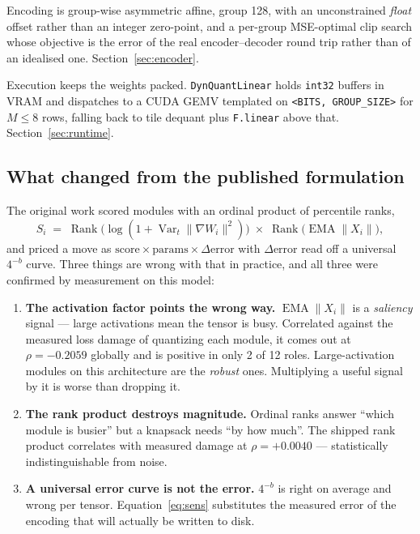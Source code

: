 \documentclass[11pt]{article}
\newcommand{\code}[1]{\texttt{#1}}
\begin{document}
Encoding is group-wise asymmetric affine, group 128, with an unconstrained \emph{float} offset
rather than an integer zero-point, and a per-group MSE-optimal clip search whose objective is the
error of the real encoder--decoder round trip rather than of an idealised one.
Section~\ref{sec:encoder}.

Execution keeps the weights packed. \code{DynQuantLinear} holds \code{int32} buffers in VRAM and
dispatches to a CUDA GEMV templated on \code{<BITS, GROUP\_SIZE>} for $M \le 8$ rows, falling back
to tile dequant plus \code{F.linear} above that. Section~\ref{sec:runtime}.

\subsection{What changed from the published formulation}

The original work scored modules with an ordinal product of percentile ranks,
\begin{equation}
S_i \;=\; \operatorname{Rank}\!\bigl(\log(1 + \operatorname{Var}_t\lVert\nabla W_i\rVert^2)\bigr)
\;\times\;
\operatorname{Rank}\!\bigl(\operatorname{EMA}\lVert X_i\rVert\bigr),
\label{eq:oldscore}
\end{equation}
and priced a move as $\text{score} \times \text{params} \times \Delta\text{error}$ with
$\Delta\text{error}$ read off a universal $4^{-b}$ curve. Three things are wrong with that in
practice, and all three were confirmed by measurement on this model:

\begin{enumerate}
\item \textbf{The activation factor points the wrong way.} $\operatorname{EMA}\lVert X_i\rVert$
is a \emph{saliency} signal --- large activations mean the tensor is busy. Correlated against the
measured loss damage of quantizing each module, it comes out at $\rho = -0.2059$ globally and is
positive in only 2 of 12 roles. Large-activation modules on this architecture are the
\emph{robust} ones. Multiplying a useful signal by it is worse than dropping it.
\item \textbf{The rank product destroys magnitude.} Ordinal ranks answer ``which module is
busier'' but a knapsack needs ``by how much''. The shipped rank product correlates with measured
damage at $\rho = +0.0040$ --- statistically indistinguishable from noise.
\item \textbf{A universal error curve is not the error.} $4^{-b}$ is right on average and wrong
per tensor. Equation~\ref{eq:sens} substitutes the measured error of the encoding that will
actually be written to disk.
\end{enumerate}
\end{document}
